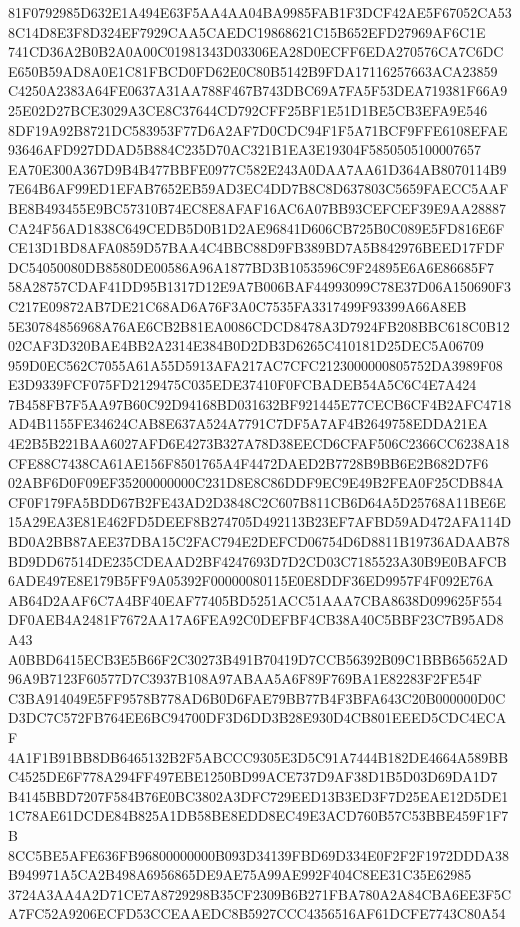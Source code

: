 \documentclass[UTF8,fontset=fandol,zihao=-4,a4paper]{ctexart}
\begin{document}
{{81F0792985D632E1A494E63F5AA4AA04BA9985FAB1F3DCF42AE5F67052CA538C14D8E3F8D324EF7929CAA5CAEDC19868621C15B652EFD27969AF6C1E
741CD36A2B0B2A0A00C01981343D03306EA28D0ECFF6EDA270576CA7C6DCE650B59AD8A0E1C81FBCD0FD62E0C80B5142B9FDA17116257663ACA23859
C4250A2383A64FE0637A31AA788F467B743DBC69A7FA5F53DEA719381F66A925E02D27BCE3029A3CE8C37644CD792CFF25BF1E51D1BE5CB3EFA9E546
8DF19A92B8721DC583953F77D6A2AF7D0CDC94F1F5A71BCF9FFE6108EFAE93646AFD927DDAD5B884C235D70AC321B1EA3E19304F5850505100007657
EA70E300A367D9B4B477BBFE0977C582E243A0DAA7AA61D364AB8070114B97E64B6AF99ED1EFAB7652EB59AD3EC4DD7B8C8D637803C5659FAECC5AAF
BE8B493455E9BC57310B74EC8E8AFAF16AC6A07BB93CEFCEF39E9AA28887CA24F56AD1838C649CEDB5D0B1D2AE96841D606CB725B0C089E5FD816E6F
CE13D1BD8AFA0859D57BAA4C4BBC88D9FB389BD7A5B842976BEED17FDFDC54050080DB8580DE00586A96A1877BD3B1053596C9F24895E6A6E86685F7
58A28757CDAF41DD95B1317D12E9A7B006BAF44993099C78E37D06A150690F3C217E09872AB7DE21C68AD6A76F3A0C7535FA3317499F93399A66A8EB
5E30784856968A76AE6CB2B81EA0086CDCD8478A3D7924FB208BBC618C0B1202CAF3D320BAE4BB2A2314E384B0D2DB3D6265C410181D25DEC5A06709
959D0EC562C7055A61A55D5913AFA217AC7CFC2123000000805752DA3989F08E3D9339FCF075FD2129475C035EDE37410F0FCBADEB54A5C6C4E7A424
7B458FB7F5AA97B60C92D94168BD031632BF921445E77CECB6CF4B2AFC4718AD4B1155FE34624CAB8E637A524A7791C7DF5A7AF4B2649758EDDA21EA
4E2B5B221BAA6027AFD6E4273B327A78D38EECD6CFAF506C2366CC6238A18CFE88C7438CA61AE156F8501765A4F4472DAED2B7728B9BB6E2B682D7F6
02ABF6D0F09EF35200000000C231D8E8C86DDF9EC9E49B2FEA0F25CDB84ACF0F179FA5BDD67B2FE43AD2D3848C2C607B811CB6D64A5D25768A11BE6E
15A29EA3E81E462FD5DEEF8B274705D492113B23EF7AFBD59AD472AFA114DBD0A2BB87AEE37DBA15C2FAC794E2DEFCD06754D6D8811B19736ADAAB78
BD9DD67514DE235CDEAAD2BF4247693D7D2CD03C7185523A30B9E0BAFCB6ADE497E8E179B5FF9A05392F00000080115E0E8DDF36ED9957F4F092E76A
AB64D2AAF6C7A4BF40EAF77405BD5251ACC51AAA7CBA8638D099625F554DF0AEB4A2481F7672AA17A6FEA92C0DEFBF4CB38A40C5BBF23C7B95AD8A43
A0BBD6415ECB3E5B66F2C30273B491B70419D7CCB56392B09C1BBB65652AD96A9B7123F60577D7C3937B108A97ABAA5A6F89F769BA1E82283F2FE54F
C3BA914049E5FF9578B778AD6B0D6FAE79BB77B4F3BFA643C20B000000D0CD3DC7C572FB764EE6BC94700DF3D6DD3B28E930D4CB801EEED5CDC4ECAF
4A1F1B91BB8DB6465132B2F5ABCCC9305E3D5C91A7444B182DE4664A589BBC4525DE6F778A294FF497EBE1250BD99ACE737D9AF38D1B5D03D69DA1D7
B4145BBD7207F584B76E0BC3802A3DFC729EED13B3ED3F7D25EAE12D5DE11C78AE61DCDE84B825A1DB58BE8EDD8EC49E3ACD760B57C53BBE459F1F7B
8CC5BE5AFE636FB96800000000B093D34139FBD69D334E0F2F2F1972DDDA38B949971A5CA2B498A6956865DE9AE75A99AE992F404C8EE31C35E62985
3724A3AA4A2D71CE7A8729298B35CF2309B6B271FBA780A2A84CBA6EE3F5CA7FC52A9206ECFD53CCEAAEDC8B5927CCC4356516AF61DCFE7743C80A54
}}
\end{document}
